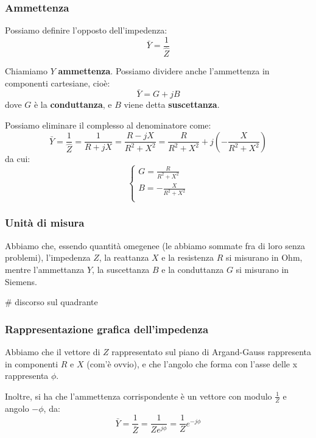 \documentclass[a4paper,11pt]{article}
\begin{document}
\subsubsection{Ammettenza}
Possiamo definire l'opposto dell'impedenza:
$$
\bar{Y} = \frac{1}{\hat{Z}}
$$

Chiamiamo $Y$ \textbf{ammettenza}.
Possiamo dividere anche l'ammettenza in componenti cartesiane, cioè:
$$
\bar{Y} = G + j B
$$
dove $G$ è la \textbf{conduttanza}, e $B$ viene detta \textbf{suscettanza}.

Possiamo eliminare il complesso al denominatore come:
$$
\bar{Y} = \frac{1}{\hat{Z}} = \frac{1}{R + jX} = \frac{R - jX}{R^2 + X^2} = \frac{R}{R^2 + X^2} + j \left(-\frac{X}{R^2 + X^2}\right)
$$
da cui:
\[
	\begin{cases}
		G = \frac{R}{R^2 + X^2} \\ 	
		B = -\frac{X}{R^2 + X^2} \\ 	
	\end{cases}
\]

\subsubsection{Unità di misura}
Abbiamo che, essendo quantità omegenee (le abbiamo sommate fra di loro senza problemi), l'impedenza $Z$, la reattanza $X$ e la resistenza $R$ si misurano in Ohm, mentre l'ammettanza $Y$, la suscettanza $B$ e la conduttanza $G$ si misurano in Siemens.

# discorso sul quadrante

\subsubsection{Rappresentazione grafica dell'impedenza}
Abbiamo che il vettore di $Z$ rappresentato sul piano di Argand-Gauss rappresenta in componenti $R$ e $X$ (com'è ovvio), e che l'angolo che forma con l'asse delle x rappresenta $\phi$.

Inoltre, si  ha che l'ammettenza corrispondente è un vettore con modulo $\frac{1}{Z}$ e angolo $-\phi$, da:
$$
\bar{Y} = \frac{1}{\bar{Z}} = \frac{1}{Ze^{j\phi}} = \frac{1}{Z} e^{-j\phi}
$$
\end{document}
